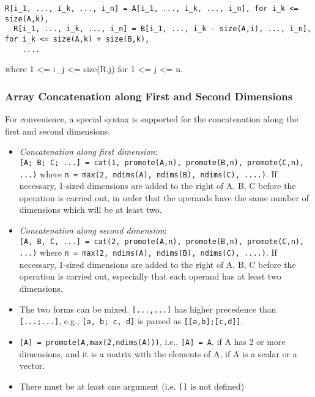 \begin{lstlisting}[language=modelica]
  R[i_1, ..., i_k, ..., i_n] = A[i_1, ..., i_k, ..., i_n], for i_k <= size(A,k),
  R[i_1, ..., i_k, ..., i_n] = B[i_1, ..., i_k - size(A,i), ..., i_n], for i_k <= size(A,k) + size(B,k),
    ....
\end{lstlisting}
    where 1 \textless{}= i\_j \textless{}= size(R,j) for 1 \textless{}= j \textless{}= n.

\subsubsection{Array Concatenation along First and Second Dimensions}

For convenience, a special syntax is supported for the concatenation
along the first and second dimensions.

\begin{itemize}
\item
  \emph{Concatenation along first dimension}:\\
\lstinline![A; B; C; ...] = cat(1, promote(A,n), promote(B,n), promote(C,n),  ...)!
where \lstinline!n = max(2, ndims(A), ndims(B), ndims(C), ....)!. If necessary, 1-sized
  dimensions are added to the right of A, B, C before the operation is
  carried out, in order that the operands have the same number of
  dimensions which will be at least two.
\item
  \emph{Concatenation along second dimension}:\\
\lstinline![A, B, C, ...] = cat(2, promote(A,n), promote(B,n), promote(C,n), ...)! 
where \lstinline!n = max(2, ndims(A), ndims(B), ndims(C), ....)!. If necessary, 1-sized
  dimensions are added to the right of A, B, C before the operation is
  carried out, especially that each operand has at least two dimensions.
\item
  The two forms can be mixed. \lstinline![...,...]! has higher precedence than
 \lstinline![...;...]!, e.g., \lstinline![a, b; c, d]! is parsed as \lstinline![[a,b];[c,d]]!.
\item
\lstinline![A] = promote(A,max(2,ndims(A)))!, i.e., \lstinline![A] = A!, if A has 2 or
  more dimensions, and it is a matrix with the elements of A, if A is a
  scalar or a vector.
\item
  There must be at least one argument (i.e. \lstinline![]! is not defined)
\end{itemize}

